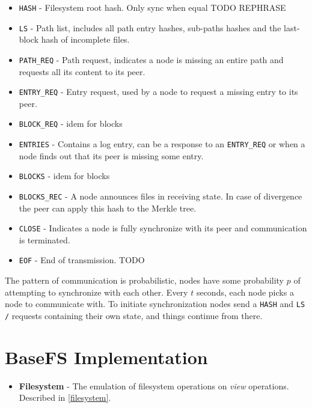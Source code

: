 \documentclass{sig-alternate}
\begin{document}
\begin{itemize}
\item \texttt{HASH} - Filesystem root hash. Only sync when equal TODO REPHRASE
\item \texttt{LS} - Path list, includes all path entry hashes, sub-paths hashes and the last-block hash of incomplete files.
\item \texttt{PATH\_REQ} - Path request, indicates a node is missing an entire path and requests all its content to its peer.
\item \texttt{ENTRY\_REQ} - Entry request, used by a node to request a missing entry to its peer.
\item \texttt{BLOCK\_REQ} - idem for blocks
\item \texttt{ENTRIES} - Contains a log entry, can be a response to an \texttt{ENTRY\_REQ} or when a node finds out that its peer is missing some entry.
\item \texttt{BLOCKS} - idem for blocks
\item \texttt{BLOCKS\_REC} - A node announces files in receiving state. In case of divergence the peer can apply this hash to the Merkle tree.
\item \texttt{CLOSE} - Indicates a node is fully synchronize with its peer and communication is terminated.
\item \texttt{EOF} - End of transmission. TODO
\end{itemize}


The pattern of communication is probabilistic, nodes have some probability $p$ of attempting to synchronize with each other. Every $t$ seconds, each node picks a node to communicate with. To initiate synchronization nodes send a \texttt{HASH} and \texttt{LS /} requests containing their own state, and things continue from there.



\section{BaseFS Implementation}

\begin{itemize}
  \item \textbf{Filesystem} - The emulation of filesystem operations on \textit{view} operations. Described in \ref{filesystem}.
\end{itemize}
\end{document}
